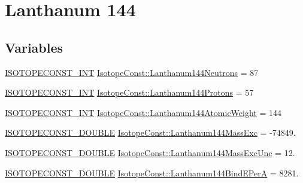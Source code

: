 \hypertarget{group___isotope_const-_lanthanum-_la144}{}\section{Lanthanum 144}
\label{group___isotope_const-_lanthanum-_la144}
\subsection*{Variables}
\begin{DoxyCompactItemize}
\item 
\mbox{\hyperlink{group___isotope_const-_macros_ga5f18360b3e99483a35c32d789e62621c}{I\+S\+O\+T\+O\+P\+E\+C\+O\+N\+S\+T\+\_\+\+I\+NT}} \mbox{\hyperlink{group___isotope_const-_lanthanum-_la144_ga95d9c66ba06ad6ac52844ba60c74f1e4}{Isotope\+Const\+::\+Lanthanum144\+Neutrons}} = 87
\item 
\mbox{\hyperlink{group___isotope_const-_macros_ga5f18360b3e99483a35c32d789e62621c}{I\+S\+O\+T\+O\+P\+E\+C\+O\+N\+S\+T\+\_\+\+I\+NT}} \mbox{\hyperlink{group___isotope_const-_lanthanum-_la144_ga390d814c3240e25b2fa0ee1e0c531399}{Isotope\+Const\+::\+Lanthanum144\+Protons}} = 57
\item 
\mbox{\hyperlink{group___isotope_const-_macros_ga5f18360b3e99483a35c32d789e62621c}{I\+S\+O\+T\+O\+P\+E\+C\+O\+N\+S\+T\+\_\+\+I\+NT}} \mbox{\hyperlink{group___isotope_const-_lanthanum-_la144_gaa26d27d4364cf0fd94e4cb5f34285b35}{Isotope\+Const\+::\+Lanthanum144\+Atomic\+Weight}} = 144
\item 
\mbox{\hyperlink{group___isotope_const-_macros_ga8f45a7272ce02c0b4c65c44636ed719a}{I\+S\+O\+T\+O\+P\+E\+C\+O\+N\+S\+T\+\_\+\+D\+O\+U\+B\+LE}} \mbox{\hyperlink{group___isotope_const-_lanthanum-_la144_ga81926dea281559fbea833565e7142781}{Isotope\+Const\+::\+Lanthanum144\+Mass\+Exc}} = -\/74849.
\item 
\mbox{\hyperlink{group___isotope_const-_macros_ga8f45a7272ce02c0b4c65c44636ed719a}{I\+S\+O\+T\+O\+P\+E\+C\+O\+N\+S\+T\+\_\+\+D\+O\+U\+B\+LE}} \mbox{\hyperlink{group___isotope_const-_lanthanum-_la144_ga8d04d99f92336dac9735d1a4fc9dba73}{Isotope\+Const\+::\+Lanthanum144\+Mass\+Exc\+Unc}} = 12.
\item 
\mbox{\hyperlink{group___isotope_const-_macros_ga8f45a7272ce02c0b4c65c44636ed719a}{I\+S\+O\+T\+O\+P\+E\+C\+O\+N\+S\+T\+\_\+\+D\+O\+U\+B\+LE}} \mbox{\hyperlink{group___isotope_const-_lanthanum-_la144_ga48388dc15623b4d1b475817ddaafe76b}{Isotope\+Const\+::\+Lanthanum144\+Bind\+E\+PerA}} = 8281.
\item 

\end{DoxyCompactItemize}
